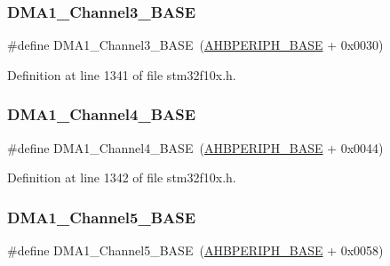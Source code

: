 \subsubsection{\texorpdfstring{D\+M\+A1\+\_\+\+Channel3\+\_\+\+B\+A\+SE}{DMA1\_Channel3\_BASE}}
{\footnotesize\ttfamily \#define D\+M\+A1\+\_\+\+Channel3\+\_\+\+B\+A\+SE~(\hyperlink{group___peripheral__memory__map_ga92eb5d49730765d2abd0f5b09548f9f5}{A\+H\+B\+P\+E\+R\+I\+P\+H\+\_\+\+B\+A\+SE} + 0x0030)}



Definition at line 1341 of file stm32f10x.\+h.

\mbox{\label{group___peripheral__memory__map_ga1adc93cd0baf0897202c71110e045692}} 
\subsubsection{\texorpdfstring{D\+M\+A1\+\_\+\+Channel4\+\_\+\+B\+A\+SE}{DMA1\_Channel4\_BASE}}
{\footnotesize\ttfamily \#define D\+M\+A1\+\_\+\+Channel4\+\_\+\+B\+A\+SE~(\hyperlink{group___peripheral__memory__map_ga92eb5d49730765d2abd0f5b09548f9f5}{A\+H\+B\+P\+E\+R\+I\+P\+H\+\_\+\+B\+A\+SE} + 0x0044)}



Definition at line 1342 of file stm32f10x.\+h.

\mbox{\label{group___peripheral__memory__map_gac041a71cd6c1973964f847a68aa14478}} 
\subsubsection{\texorpdfstring{D\+M\+A1\+\_\+\+Channel5\+\_\+\+B\+A\+SE}{DMA1\_Channel5\_BASE}}
{\footnotesize\ttfamily \#define D\+M\+A1\+\_\+\+Channel5\+\_\+\+B\+A\+SE~(\hyperlink{group___peripheral__memory__map_ga92eb5d49730765d2abd0f5b09548f9f5}{A\+H\+B\+P\+E\+R\+I\+P\+H\+\_\+\+B\+A\+SE} + 0x0058)}



